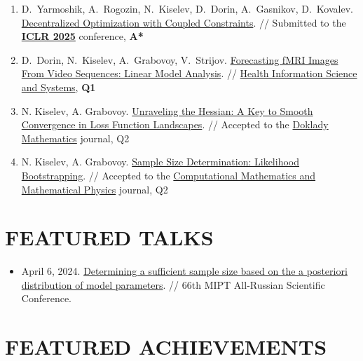 \documentclass[11pt,a4paper]{moderncv}
\begin{document}
\begin{minipage}[t]{0.62\textwidth}
\begin{enumerate}
    \item D.~Yarmoshik, A.~Rogozin, N.~Kiselev, D.~Dorin, A.~Gasnikov, D.~Kovalev. \href{https://arxiv.org/abs/2407.02020}{Decentralized Optimization with Coupled Constraints}. // Submitted to the \href{https://iclr.cc/}{\textbf{ICLR 2025}} conference, \textbf{A*}
    \item D.~Dorin, N.~Kiselev, A.~Grabovoy, V.~Strijov. \href{https://doi.org/10.1007/s13755-024-00315-5}{Forecasting fMRI Images From Video Sequences: Linear Model Analysis}. // \href{https://link.springer.com/journal/13755}{Health Information Science and Systems}, \textbf{Q1}
    \item N. Kiselev, A. Grabovoy. \href{https://arxiv.org/abs/2409.11995}{Unraveling the Hessian: A Key to Smooth Convergence in Loss Function Landscapes}. // Accepted to the \href{https://link.springer.com/journal/11472}{Doklady Mathematics} journal, Q2
    \item N. Kiselev, A. Grabovoy. \href{https://github.com/kisnikser/Likelihood-Bootstrapping}{Sample Size Determination: Likelihood Bootstrapping}. // Accepted to the \href{https://link.springer.com/journal/11470}{Computational Mathematics and Mathematical Physics} journal, Q2
\end{enumerate}

\section{FEATURED TALKS}

\begin{itemize}
\item April 6, 2024. \href{https://www.youtube.com/live/WnIRaRl730A?si=q0eScgnDP2ZidCpK&t=1723}{Determining a sufficient sample size based on the a posteriori distribution of model parameters}. // 66th MIPT All-Russian Scientific Conference.
\end{itemize}

\section{FEATURED ACHIEVEMENTS}


\end{minipage}
\end{document}
